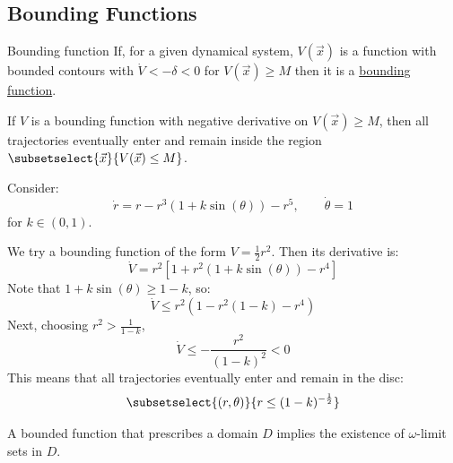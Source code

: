 \documentclass[../Main.tex]{subfiles}
\begin{document}
\subsection{Bounding Functions}
\begin{definition}{Bounding function}
    If, for a given dynamical system, $V(\vec x)$ is a function with bounded contours with $\dot{V} < -\delta < 0$ for $V(\vec x) \geq M$ then it is a \underline{bounding function}.
\end{definition}
\begin{proposition}
    If $V$ is a bounding function with negative derivative on $V(\vec x) \geq M$, then all trajectories eventually enter and remain inside the region $\subsetselect{\vec x}{V(\vec x) \leq M}$.
    \label{propBoundingFunction}
\end{proposition}
\begin{example}
    Consider:
    \begin{equation*}
        \dot{r} = r - r^3(1 + k\sin(\theta)) - r^5,\qquad \dot{\theta} = 1
    \end{equation*}
    for $k \in (0, 1)$.

    We try a bounding function of the form $V = \frac12 r^2$. Then its derivative is:
    \begin{equation*}
        \dot{V} = r^2\left[1 + r^2 (1 + k\sin(\theta)) - r^4\right]
    \end{equation*}
    Note that $1 + k\sin(\theta) \geq 1-k$, so:
    \begin{equation*}
        \dot{V} \leq r^2 (1 - r^2(1-k) - r^4)
    \end{equation*}
    Next, choosing $r^2 > \frac1{1-k}$,
    \begin{equation*}
        \dot{V} \leq -\frac{r^2}{(1-k)^2} < 0
    \end{equation*}
    This means that all trajectories eventually enter and remain in the disc:
    \begin{equation*}
        \subsetselect{(r, \theta)}{r \leq (1-k)^{-\frac12}}
    \end{equation*}
\end{example}
A bounded function that prescribes a domain $D$ implies the existence of $\omega$-limit sets in $D$.
\end{document}
